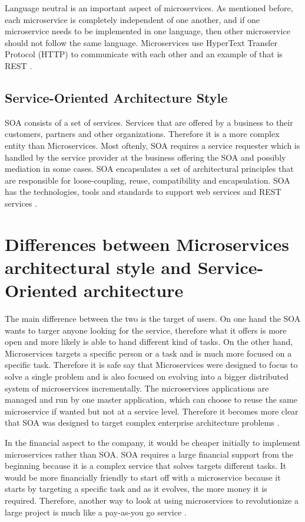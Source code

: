 \documentclass{IEEEtran}
\begin{document}
			Language neutral is an important aspect of microservices. As mentioned before, each microservice is completely independent of one another, and if one microservice needs to be implemented in one language, then other microservice should not follow the same language. Microservices use HyperText Transfer Protocol (HTTP) to communicate with each other and an example of that is REST \cite{ibmred}.

		\subsection{Service-Oriented Architecture Style}
			SOA consists of a set of services. Services that are offered by a business to their customers, partners and other organizations. Therefore it is a more complex entity than Microservices. Most oftenly, SOA requires a service requester which is handled by the service provider at the business offering the SOA and possibly mediation in some cases. SOA encapsulates a set of architectural principles that are responsible for loose-coupling, reuse, compatibility and encapsulation. SOA has the technologies, tools and standards to support web services and REST services \cite{ibmred}.


	\section{Differences between Microservices architectural style and Service-Oriented architecture}
		The main difference between the two is the target of users. On one hand the SOA wants to targer anyone looking for the service, therefore what it offers is more open and more likely is able to hand different kind of tasks. On the other hand, Microservices targets a specific person or a task and is much more focused on a specific task. Therefore it is safe say that Microservices were designed to focus to solve a single problem and is also focused on evolving into a bigger distributed system of microservices incrementally. The microservices applications are managed and run by one master application, which can choose to reuse the same microservice if wanted but not at a service level. Therefore it becomes more clear that SOA was designed to target complex enterprise architecture problems \cite{ibmred}. 
		\newline
		
		In the financial aspect to the company, it would be cheaper initially to implement microservices rather than SOA. SOA requires a large financial support from the beginning because it is a complex service that solves targets different tasks. It would be more financially friendly to start off with a microservice because it starts by targeting a specific task and as it evolves, the more money it is required. Therefore, another way to look at using microservices to revolutionize a large project is much like a pay-as-you go service \cite{ibmred}. 
\end{document}
